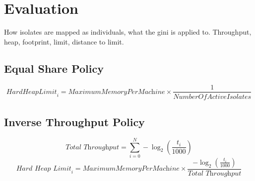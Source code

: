 \documentclass{l4proj}
\begin{document}
\chapter{Evaluation}
How isolates are mapped as individuals, what the gini is applied to.
Throughput, heap, footprint, limit, distance to limit.
\section{Equal Share Policy}
\begin{equation}
\textit{HardHeapLimit}_i = \textit{MaximumMemoryPerMachine} \times \frac{1}{\textit{NumberOfActiveIsolates}}
\end{equation}
\section{Inverse Throughput Policy}
\begin{equation}
\textit{Total Throughput} = \sum_{i=0}^{N} -\log_2(\frac{t_i}{1000})
\end{equation}
\begin{equation}
\textit{Hard Heap Limit}_i = \textit{MaximumMemoryPerMachine} \times \frac{-\log_2(\frac{t_i}{1000})}{\textit{Total Throughput}}
\end{equation}
\end{document}

